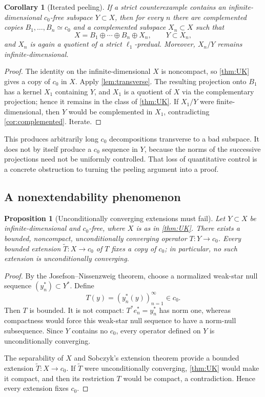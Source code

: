 \documentclass[11pt]{article}
\newtheorem{proposition}[theorem]{Proposition}
\newtheorem{corollary}[theorem]{Corollary}
\theoremstyle{definition}
\newcommand{\isom}{\simeq}
\begin{document}
\begin{corollary}[Iterated peeling]\label{cor:peeling}
If a strict counterexample contains an infinite-dimensional $c_0$-free
subspace $Y\subset X$, then for every $n$ there are complemented copies
$B_1,\ldots,B_n\isom c_0$ and a complemented subspace $X_n\subset X$ such
that
\[
    X = B_1\oplus\cdots\oplus B_n\oplus X_n,
    \qquad Y\subset X_n,
\]
and $X_n$ is again a quotient of a strict $\ell_1$-predual.  Moreover,
$X_n/Y$ remains infinite-dimensional.
\end{corollary}

\begin{proof}
The identity on the infinite-dimensional $X$ is noncompact, so
\cref{thm:UK} gives a copy of $c_0$ in $X$.  Apply
\cref{lem:transverse}.  The resulting projection onto $B_1$ has a kernel
$X_1$ containing $Y$, and $X_1$ is a quotient of $X$ via the complementary
projection; hence it remains in the class of \cref{thm:UK}.  If $X_1/Y$ were
finite-dimensional, then $Y$ would be complemented in $X_1$, contradicting
\cref{cor:complemented}.  Iterate.
\end{proof}

This produces arbitrarily long $c_0$ decompositions transverse to a bad
subspace.  It does not by itself produce a $c_0$ sequence in $Y$, because the
norms of the successive projections need not be uniformly controlled.  That
loss of quantitative control is a concrete obstruction to turning the
peeling argument into a proof.

\subsection{A nonextendability phenomenon}

\begin{proposition}[Unconditionally converging extensions must fail]
\label{prop:extension}
Let $Y\subset X$ be infinite-dimensional and $c_0$-free, where $X$ is as in
\cref{thm:UK}.  There exists a bounded, noncompact, unconditionally
converging operator $T:Y\to c_0$.  Every bounded extension
$\widetilde T:X\to c_0$ of $T$ fixes a copy of $c_0$; in particular, no such
extension is unconditionally converging.
\end{proposition}

\begin{proof}
By the Josefson--Nissenzweig theorem, choose a normalized weak-star null
sequence $(y_n^*)\subset Y^*$.  Define
\[
       T(y)=(y_n^*(y))_{n=1}^\infty\in c_0.
\]
Then $T$ is bounded.  It is not compact: $T^*e_n^*=y_n^*$ has norm one,
whereas compactness would force this weak-star null sequence to have a
norm-null subsequence.  Since $Y$ contains no $c_0$, every operator defined
on $Y$ is unconditionally converging.

The separability of $X$ and Sobczyk's extension theorem provide a bounded
extension $\widetilde T:X\to c_0$.  If $\widetilde T$ were unconditionally
converging, \cref{thm:UK} would make it compact, and then its restriction
$T$ would be compact, a contradiction.  Hence every extension fixes $c_0$.
\end{proof}
\end{document}
